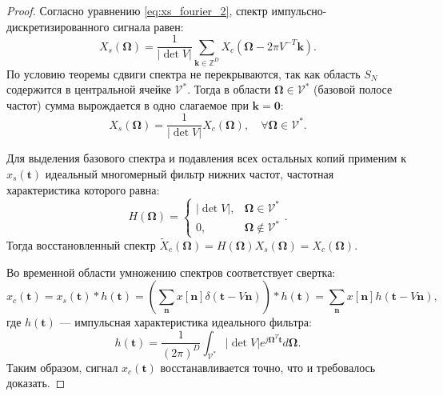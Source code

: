 \documentclass[12pt, a4paper]{article}
\begin{document}
\begin{proof}
Согласно уравнению \eqref{eq:xs_fourier_2}, спектр импульсно-дискретизированного сигнала равен:
\begin{equation*}
    X_s(\boldsymbol{\Omega}) = \frac{1}{|\det V|} \sum_{\mathbf{k} \in \mathbb{Z}^D} X_c(\boldsymbol{\Omega} - 2\pi V^{-T} \mathbf{k}).
\end{equation*}
По условию теоремы сдвиги спектра не перекрываются, так как область $S_N$ содержится в центральной ячейке $\mathcal{V}^*$. Тогда в области $\boldsymbol{\Omega} \in \mathcal{V}^*$ (базовой полосе частот) сумма вырождается в одно слагаемое при $\mathbf{k} = \mathbf{0}$:
\begin{equation*}
    X_s(\boldsymbol{\Omega}) = \frac{1}{|\det V|} X_c(\boldsymbol{\Omega}), \quad \forall \boldsymbol{\Omega} \in \mathcal{V}^*.
\end{equation*}

Для выделения базового спектра и подавления всех остальных копий применим к $x_s(\mathbf{t})$ идеальный многомерный фильтр нижних частот, частотная характеристика которого равна:
\begin{equation}
    H(\boldsymbol{\Omega}) = \begin{cases} |\det V|, & \boldsymbol{\Omega} \in \mathcal{V}^* \\ 0, & \boldsymbol{\Omega} \notin \mathcal{V}^* \end{cases}.
\end{equation}
Тогда восстановленный спектр $\tilde{X}_c(\boldsymbol{\Omega}) = H(\boldsymbol{\Omega}) X_s(\boldsymbol{\Omega}) = X_c(\boldsymbol{\Omega})$.

Во временной области умножению спектров соответствует свертка:
\begin{equation*}
    x_c(\mathbf{t}) = x_s(\mathbf{t}) * h(\mathbf{t}) = \left( \sum_{\mathbf{n}} x[\mathbf{n}] \delta(\mathbf{t} - V \mathbf{n}) \right) * h(\mathbf{t}) = \sum_{\mathbf{n}} x[\mathbf{n}] h(\mathbf{t} - V \mathbf{n}),
\end{equation*}
где $h(\mathbf{t})$ --- импульсная характеристика идеального фильтра:
\begin{equation} \label{eq:impulse_resp}
    h(\mathbf{t}) = \frac{1}{(2\pi)^D} \int_{\mathcal{V}^*} |\det V| e^{j \boldsymbol{\Omega}^T \mathbf{t}} d\boldsymbol{\Omega}.
\end{equation}
Таким образом, сигнал $x_c(\mathbf{t})$ восстанавливается точно, что и требовалось доказать.
\end{proof}
\end{document}
